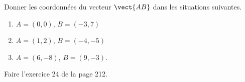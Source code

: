 
\begin{exercice}\label{exosmath-0332}

    Donner les coordonnées du vecteur \( \vect{ AB }\) dans les situations suivantes.
    \begin{enumerate}
        \item
            \( A=(0,0)\), \( B=(-3,7)\)
        \item
            \( A=(1,2)\), \( B=(-4,-5)\)
        \item
            \( A=(6,-8)\), \( B=(9,-3)\).
    \end{enumerate}

    Faire l'exercice 24 de la page 212.

\end{exercice}
